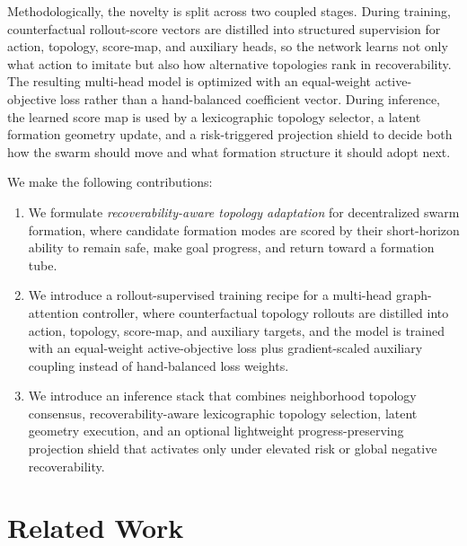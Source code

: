 \documentclass[journal]{IEEEtran}
\begin{document}
Methodologically, the novelty is split across two coupled stages.
During training, counterfactual rollout-score vectors are distilled into
structured supervision for action, topology, score-map, and auxiliary
heads, so the network learns not only what action to imitate but also
how alternative topologies rank in recoverability. The resulting
multi-head model is optimized with an equal-weight active-objective
loss rather than a hand-balanced coefficient vector. During inference,
the learned score map is used by a lexicographic topology selector, a
latent formation geometry update, and a risk-triggered projection
shield to decide both how the swarm should move and what formation
structure it should adopt next.

We make the following contributions:
\begin{enumerate}
    \item We formulate \emph{recoverability-aware topology adaptation}
    for decentralized swarm formation, where candidate formation modes
    are scored by their short-horizon ability to remain safe, make goal
    progress, and return toward a formation tube.

    \item We introduce a rollout-supervised training recipe for a
    multi-head graph-attention controller, where counterfactual topology
    rollouts are distilled into action, topology, score-map, and
    auxiliary targets, and the model is trained with an equal-weight
    active-objective loss plus gradient-scaled auxiliary coupling
    instead of hand-balanced loss weights.

    \item We introduce an inference stack that combines neighborhood
    topology consensus, recoverability-aware lexicographic topology
    selection, latent geometry execution, and an optional lightweight
    progress-preserving projection shield that activates only under
    elevated risk or global negative recoverability.
\end{enumerate}

\section{Related Work}
\label{sec:related}
\end{document}
